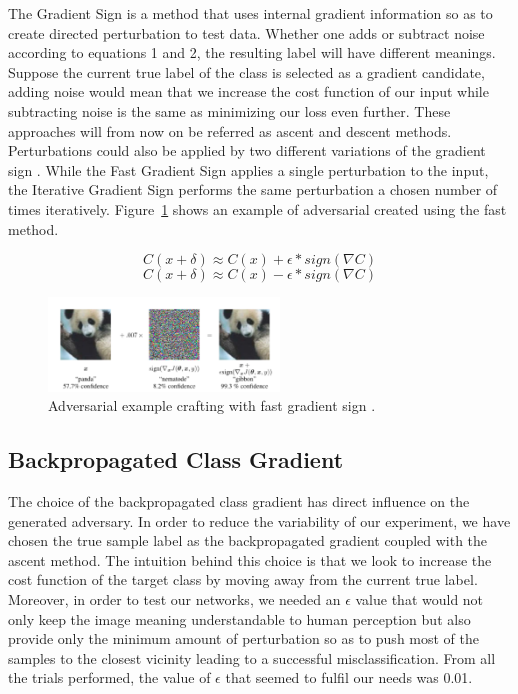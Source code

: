 \documentclass[runningheads,a4paper]{llncs}
\begin{document}
The Gradient Sign is a method that uses internal gradient information so as to create directed perturbation to test data. Whether one adds or subtract noise according to equations 1 and 2, the resulting label will have different meanings. Suppose the current true label of the class is selected as a gradient candidate, adding noise would mean that we increase the cost function of our input while subtracting noise is the same as minimizing our loss even further. These approaches will from now on be referred as ascent and descent methods. Perturbations could also be applied by two different variations of the gradient sign \cite{goodfellow2014}. While the Fast Gradient Sign applies a single perturbation to the input, the Iterative Gradient Sign performs the same perturbation a chosen number of times iteratively. Figure~\ref{fig:fgsm_craft} shows an example of adversarial created using the fast method.


\begin{equation}
C(x + \delta)\approx C(x) + \epsilon * sign(\nabla C)
\end{equation}
\begin{equation}
C(x + \delta)\approx C(x) - \epsilon * sign(\nabla C)
\end{equation}
\begin{figure}
	\centering
	\includegraphics[height=2.5cm]{panda.png}
	\caption{Adversarial example crafting with fast gradient sign \cite{goodfellow2014}.}
	\label{fig:fgsm_craft}
\end{figure}
\subsection{Backpropagated Class Gradient}

The choice of the backpropagated class gradient has direct influence on the generated adversary. In order to reduce the variability of our experiment, we have chosen the true sample label as the backpropagated gradient coupled with the ascent method. The intuition behind this choice is that we look to increase the cost function of the target class by moving away from the current true label. Moreover, in order to test our networks, we needed an $\epsilon$ value that would not only keep the image meaning understandable to human perception but also provide only the minimum amount of perturbation so as to push most of the samples to the closest vicinity leading to a successful misclassification. From all the trials performed, the value of $\epsilon$ that seemed to fulfil our needs was 0.01. 
\end{document}
